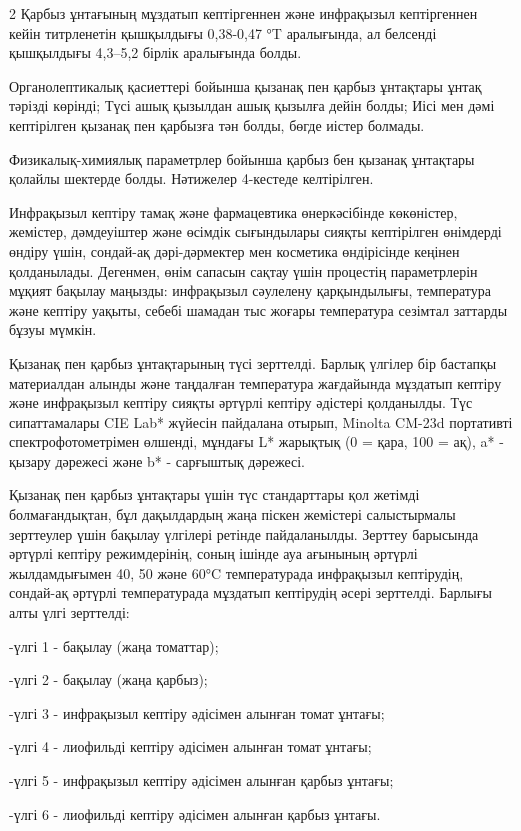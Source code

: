 \begin{multicols}{2}
Қарбыз ұнтағының мұздатып кептіргеннен және инфрақызыл кептіргеннен
кейін титрленетін қышқылдығы 0,38-0,47 °T аралығында, ал белсенді
қышқылдығы 4,3--5,2 бірлік аралығында болды.

Органолептикалық қасиеттері бойынша қызанақ пен қарбыз ұнтақтары ұнтақ
тәрізді көрінді; Түсі ашық қызылдан ашық қызылға дейін болды; Иісі мен
дәмі кептірілген қызанақ пен қарбызға тән болды, бөгде иістер болмады.

Физикалық-химиялық параметрлер бойынша қарбыз бен қызанақ ұнтақтары
қолайлы шектерде болды. Нәтижелер 4-кестеде келтірілген.

Инфрақызыл кептіру тамақ және фармацевтика өнеркәсібінде көкөністер,
жемістер, дәмдеуіштер және өсімдік сығындылары сияқты кептірілген
өнімдерді өндіру үшін, сондай-ақ дәрі-дәрмектер мен косметика
өндірісінде кеңінен қолданылады. Дегенмен, өнім сапасын сақтау үшін
процестің параметрлерін мұқият бақылау маңызды: инфрақызыл сәулелену
қарқындылығы, температура және кептіру уақыты, себебі шамадан тыс жоғары
температура сезімтал заттарды бұзуы мүмкін.

Қызанақ пен қарбыз ұнтақтарының түсі зерттелді. Барлық үлгілер бір
бастапқы материалдан алынды және таңдалған температура жағдайында
мұздатып кептіру және инфрақызыл кептіру сияқты әртүрлі кептіру әдістері
қолданылды. Түс сипаттамалары CIE Lab* жүйесін пайдалана отырып, Minolta
CM-23d портативті спектрофотометрімен өлшенді, мұндағы L* жарықтық (0 =
қара, 100 = ақ), a* - қызару дәрежесі және b* - сарғыштық дәрежесі.

Қызанақ пен қарбыз ұнтақтары үшін түс стандарттары қол жетімді
болмағандықтан, бұл дақылдардың жаңа піскен жемістері салыстырмалы
зерттеулер үшін бақылау үлгілері ретінде пайдаланылды. Зерттеу барысында
әртүрлі кептіру режимдерінің, соның ішінде ауа ағынының әртүрлі
жылдамдығымен 40, 50 және 60°C температурада инфрақызыл кептірудің,
сондай-ақ әртүрлі температурада мұздатып кептірудің әсері зерттелді.
Барлығы алты үлгі зерттелді:

-үлгі 1 - бақылау (жаңа томаттар);

-үлгі 2 - бақылау (жаңа қарбыз);

-үлгі 3 - инфрақызыл кептіру әдісімен алынған томат ұнтағы;

-үлгі 4 - лиофильді кептіру әдісімен алынған томат ұнтағы;

-үлгі 5 - инфрақызыл кептіру әдісімен алынған қарбыз ұнтағы;

-үлгі 6 - лиофильді кептіру әдісімен алынған қарбыз ұнтағы.


\end{multicols}
